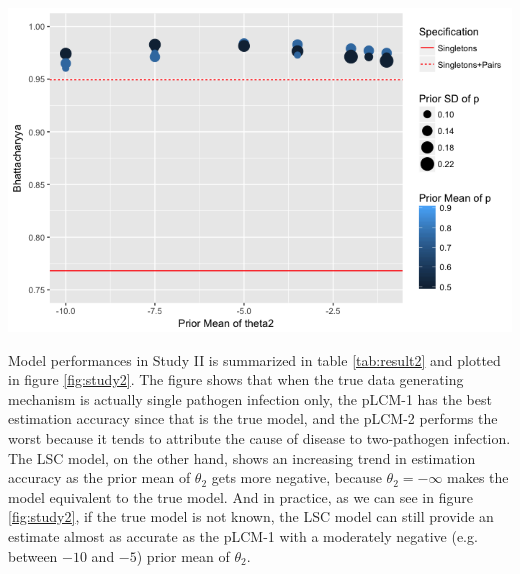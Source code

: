 \documentclass[11 pt, a4paper]{article}  %
\begin{document}
\begin{center}
\includegraphics[scale=0.6]{StudyI.png}
\label{fig:study1}
\end{center}




Model performances in Study II is summarized in table \ref{tab:result2} and plotted in figure \ref{fig:study2}. The figure shows that when the true data generating mechanism is actually single pathogen infection only, the pLCM-1 has the best estimation accuracy since that is the true model, and the pLCM-2 performs the worst because it tends to attribute the cause of disease to two-pathogen infection. The LSC model, on the other hand, shows an increasing trend in estimation accuracy as the prior mean of $\theta_2$ gets more negative, because $\theta_2 = -\infty$ makes the model equivalent to the true model. And in practice, as we can see in figure \ref{fig:study2}, if the true model is not known, the LSC model can still provide an estimate almost as accurate as the pLCM-1 with a moderately negative (e.g. between $-10$ and $-5$) prior mean of $\theta_2$.\\
\end{document}
